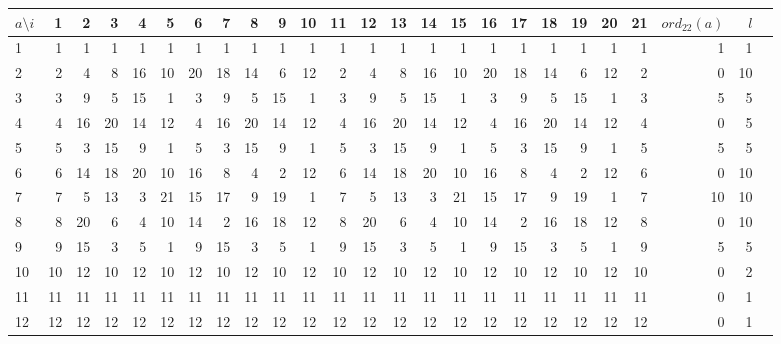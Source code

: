 \begin{refsegment}
\begin{table}[ht]
\begin{center}
\begin{tabular}{|p{16 pt}||@{\:}r@{\:}|@{\:}r@{\:}|@{\:}r@{\:}|@{\:}r@{\:}|@{\:}r@{\:}|@{\:}r@{\:}|@{\:}r@{\:}|@{\:}r@{\:}|@{\:}r@{\:}|@{\:}r@{\:}|@{\:}r@{\:}|@{\:}r@{\:}|@{\:}r@{\:}|@{\:}r@{\:}|@{\:}r@{\:}|@{\:}r@{\:}|@{\:}r@{\:}|@{\:}r@{\:}|@{\:}r@{\:}|@{\:}r@{\:}|@{\:}r@{\:}||@{\:}r@{\:}|@{\:}r@{\:}|c|}
\hline
$a \setminus i$ & 1 & 2 & 3 & 4 & 5 & 6 & 7 & 8 & 9 & 10 & 11 & 12 & 13 & 14 & 15 & 16 & 17 & 18 & 19 & 20 & 21 & $ord_{22}(a)$ & $l$\\
\hline
\hline
1 & 1 & 1 & 1 & 1 & 1 & 1 & 1 & 1 & 1 & 1 & 1 & 1 & 1 & 1 & 1 & 1 & 1 & 1 & 1 & 1 & 1 & 1 & 1\\
\hline
2 & 2 & 4 & 8 & 16 & 10 & 20 & 18 & 14 & 6 & 12 & 2 & 4 & 8 & 16 & 10 & 20 & 18 & 14 & 6 & 12 & 2 & 0 & 10\\
\hline
3 & 3 & 9 & 5 & 15 & 1 & 3 & 9 & 5 & 15 & 1 & 3 & 9 & 5 & 15 & 1 & 3 & 9 & 5 & 15 & 1 & 3 & 5 & 5\\
\hline
4 & 4 & 16 & 20 & 14 & 12 & 4 & 16 & 20 & 14 & 12 & 4 & 16 & 20 & 14 & 12 & 4 & 16 & 20 & 14 & 12 & 4 & 0 & 5\\
\hline
5 & 5 & 3 & 15 & 9 & 1 & 5 & 3 & 15 & 9 & 1 & 5 & 3 & 15 & 9 & 1 & 5 & 3 & 15 & 9 & 1 & 5 & 5 & 5\\
\hline
6 & 6 & 14 & 18 & 20 & 10 & 16 & 8 & 4 & 2 & 12 & 6 & 14 & 18 & 20 & 10 & 16 & 8 & 4 & 2 & 12 & 6 & 0 & 10\\
\hline
7 & 7 & 5 & 13 & 3 & 21 & 15 & 17 & 9 & 19 & 1 & 7 & 5 & 13 & 3 & 21 & 15 & 17 & 9 & 19 & 1 & 7 & 10 & 10\\
\hline
8 & 8 & 20 & 6 & 4 & 10 & 14 & 2 & 16 & 18 & 12 & 8 & 20 & 6 & 4 & 10 & 14 & 2 & 16 & 18 & 12 & 8 & 0 & 10\\
\hline
9 & 9 & 15 & 3 & 5 & 1 & 9 & 15 & 3 & 5 & 1 & 9 & 15 & 3 & 5 & 1 & 9 & 15 & 3 & 5 & 1 & 9 & 5 & 5\\
\hline
10 & 10 & 12 & 10 & 12 & 10 & 12 & 10 & 12 & 10 & 12 & 10 & 12 & 10 & 12 & 10 & 12 & 10 & 12 & 10 & 12 & 10 & 0 & 2\\
\hline
11 & 11 & 11 & 11 & 11 & 11 & 11 & 11 & 11 & 11 & 11 & 11 & 11 & 11 & 11 & 11 & 11 & 11 & 11 & 11 & 11 & 11 & 0 & 1\\
\hline
12 & 12 & 12 & 12 & 12 & 12 & 12 & 12 & 12 & 12 & 12 & 12 & 12 & 12 & 12 & 12 & 12 & 12 & 12 & 12 & 12 & 12 & 0 & 1\\

\end{tabular}
\end{center}
\end{table}
\end{refsegment}
